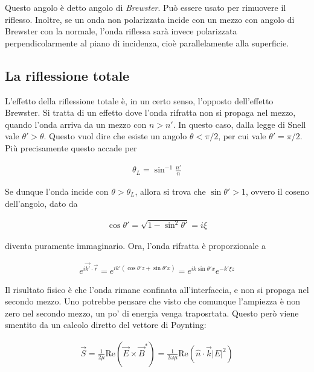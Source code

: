 \documentclass{report}
\begin{document}
Questo angolo è detto angolo di \emph{Brewster}. Può essere usato per rimuovere il riflesso. Inoltre, se un onda non polarizzata incide con un mezzo con angolo di Brewster con la normale, l'onda riflessa sarà invece polarizzata perpendicolarmente al piano di incidenza, cioè parallelamente alla superficie. 


\subsection{La riflessione totale}

L'effetto della riflessione totale è, in un certo senso, l'opposto dell'effetto Brewster. Si tratta di un effetto dove l'onda rifratta non si propaga nel mezzo, quando l'onda arriva da un mezzo con \(n > n'\). In questo caso, dalla legge di Snell vale \(\theta ' > \theta\). Questo vuol dire che esiste un angolo \(\theta < \pi/2\), per cui vale \(\theta' = \pi/2\). \\

Più precisamente questo accade per 

\begin{align}
    \theta_L = \sin^{-1}\frac{n'}{n}
\end{align}

Se dunque l'onda incide con \(\theta > \theta_L\), allora si trova che \(\sin\theta' > 1\), ovvero il coseno dell'angolo, dato da 

\begin{align}
    \cos \theta ' = \sqrt{1 - \sin^2\theta'} = i\xi
\end{align}

diventa puramente immaginario. Ora, l'onda rifratta è proporzionale a 

\begin{align}
    e^{i \vec{k'}\cdot \vec{r}} = e^{ik'(\cos\theta' z + \sin\theta' x )} = e^{ik\sin\theta' x}e^{-k'\xi z}
\end{align}

Il risultato fisico è che l'onda rimane confinata all'interfaccia, e non si propaga nel secondo mezzo. Uno potrebbe pensare che visto che comunque l'ampiezza è non zero nel secondo mezzo, un po' di energia venga traposrtata. Questo però viene smentito da un calcolo diretto del vettore di Poynting: 

\begin{align}
\vec{S} = \frac{1}{2\mu}\text{Re}(\vec{E}\times \vec{B}^*) = \frac{1}{2\omega\mu}\text{Re}(\hat{n}\cdot \vec{k}|E|^2)
\end{align}
\end{document}
